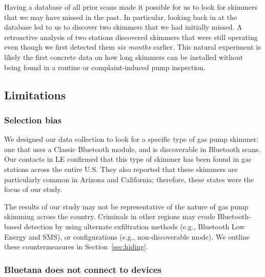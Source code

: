 Having a database of all prior scans made it possible
for us to look for skimmers that we may have missed in the past.
%
In particular, looking back in at the database led to us to discover two 
skimmers that we had initially missed.
%
A retroactive analysis of two stations discovered skimmers that were still
operating even though we first detected them \emph{six months} earlier.
%
This natural experiment is likely the first concrete data on how long skimmers
can be installed  without being found in a routine or complaint-induced pump inspection.
%



\subsection{Limitations} %

\subsubsection*{Selection bias}

We designed our data collection to look for a specific type of gas pump
skimmer: one that uses a Classic Bluetooth module, and is discoverable in
Bluetooth scans.
%
Our contacts in LE confirmed that this type of skimmer has been found in gas stations across
the entire U.S.
%
They also reported that these skimmers are particularly common in Arizona and California; therefore, these states were the focus of our study.
%
  
The results of our study may not be representative of the nature of
gas pump skimming across the country.
%
Criminals in other regions may evade Bluetooth-based detection by using alternate exfiltration methods (e.g., Bluetooth Low
Energy and SMS), or configurations (e.g., non-discoverable mode).
%  
We outline these countermeasures in Section~\ref{sec:hiding}.

\subsubsection*{Bluetana does not connect to devices}
\label{sec:cant-connect}

